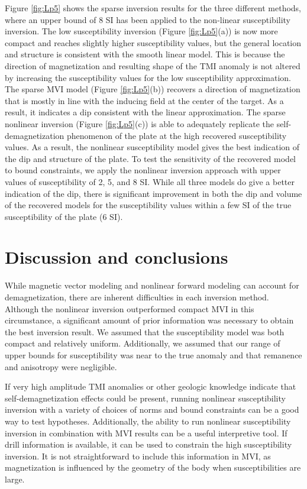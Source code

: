 \documentclass{segabs}
\begin{document}
Figure \ref{fig:Lp5} shows the sparse inversion results for the three different methods, where an upper bound of 8 SI has been applied to the non-linear susceptibility inversion. The low susceptibility inversion (Figure \ref{fig:Lp5}(a))  is now more compact and reaches slightly higher susceptibility values, but the general location and structure is consistent with the smooth linear model. This is because the direction of magnetization and resulting shape of the TMI anomaly is not altered by increasing the susceptibility values for the low susceptibility approximation. The sparse MVI model (Figure \ref{fig:Lp5}(b)) recovers a direction of magnetization that is mostly in line with the inducing field at the center of the target. As a result, it indicates a dip consistent with the linear approximation. The sparse nonlinear inversion (Figure \ref{fig:Lp5}(c))  is able to adequately replicate the self-demagnetization phenomenon of the plate at the high recovered susceptibility values. As a result, the nonlinear susceptibility model gives the best indication of the dip and structure of the plate. To test the sensitivity of the recovered model to bound constraints, we apply the nonlinear inversion approach with upper values of susceptibility of 2, 5, and 8 SI. While all three models do give a better indication of the dip, there is significant improvement in both the dip and volume of the recovered models for the susceptibility values within a few SI of the true susceptibility of the plate (6 SI).




\vspace{-0.45cm}
\section{Discussion and conclusions}
\vspace{-0.25cm}

While magnetic vector modeling and nonlinear forward modeling can account for demagnetization, there are inherent difficulties in each inversion method. Although the nonlinear inversion outperformed compact MVI in this circumstance, a significant amount of prior information was necessary to obtain the best inversion result.  We assumed that the susceptibility model was both compact and relatively uniform. Additionally, we assumed that our range of upper bounds for susceptibility was near to the true anomaly and that remanence and anisotropy were negligible. 

If very high amplitude TMI anomalies or other geologic knowledge indicate that self-demagnetization effects could be present, running nonlinear susceptibility inversion with a variety of choices of norms and bound constraints can be a good way to test hypotheses. Additionally, the ability to run nonlinear susceptibility inversion in combination with MVI results can be a useful interpretive tool. If drill information is available, it can be used to constrain the high susceptibility inversion. It is not straightforward to include this information in MVI, as magnetization is influenced by the geometry of the body when susceptibilities are large. 

\onecolumn



\end{document}
